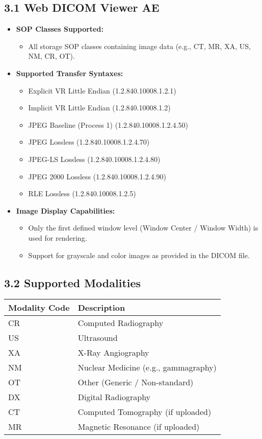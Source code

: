 \documentclass[11pt]{article}
\begin{document}
\subsection*{3.1 Web DICOM Viewer AE}

\begin{itemize}
  \item \textbf{SOP Classes Supported:}
  \begin{itemize}
    \item All storage SOP classes containing image data (e.g., CT, MR, XA, US, NM, CR, OT).
  \end{itemize}
  
  \item \textbf{Supported Transfer Syntaxes:}
  \begin{itemize}
    \item Explicit VR Little Endian (1.2.840.10008.1.2.1)
    \item Implicit VR Little Endian (1.2.840.10008.1.2)
    \item JPEG Baseline (Process 1) (1.2.840.10008.1.2.4.50)
    \item JPEG Lossless (1.2.840.10008.1.2.4.70)
    \item JPEG-LS Lossless (1.2.840.10008.1.2.4.80)
    \item JPEG 2000 Lossless (1.2.840.10008.1.2.4.90)
    \item RLE Lossless (1.2.840.10008.1.2.5)
  \end{itemize}
  
  \item \textbf{Image Display Capabilities:}
  \begin{itemize}
    \item Only the first defined window level (Window Center / Window Width) is used for rendering.
    \item Support for grayscale and color images as provided in the DICOM file.
  \end{itemize}
  
\end{itemize}

\subsection*{3.2 Supported Modalities}

\begin{center}
\begin{tabular}{ll}
\toprule
\textbf{Modality Code} & \textbf{Description} \\
\midrule
CR & Computed Radiography \\
US & Ultrasound \\
XA & X-Ray Angiography \\
NM & Nuclear Medicine (e.g., gammagraphy) \\
OT & Other (Generic / Non-standard) \\
DX & Digital Radiography \\
CT & Computed Tomography (if uploaded) \\
MR & Magnetic Resonance (if uploaded) \\
\bottomrule
\end{tabular}
\end{center}
\end{document}
